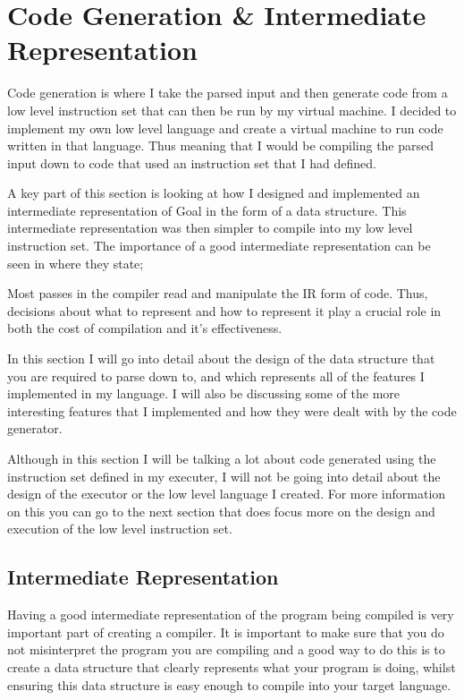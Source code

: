 
\chapter{Code Generation \& Intermediate Representation}

Code generation is where I take the parsed input and then generate code from a low level instruction set that can then be run by my virtual machine. I decided to implement my own low level language and create a virtual machine to run code written in that language. Thus meaning that I would be compiling the parsed input down to code that used an instruction set that I had defined.

A key part of this section is looking at how I designed and implemented an intermediate representation of Goal in the form of a data structure. This intermediate representation was then simpler to compile into my low level instruction set. The importance of a good intermediate representation can be seen in \cite[p.~221]{EngComp2012} where they state;

\begin{displayquote}
Most passes in the compiler read and manipulate the IR form of code. Thus, decisions about what to represent and how to represent it play a  crucial role in both the cost of compilation and it's effectiveness. 
\end{displayquote}

In this section I will go into detail about the design of the data structure that you are required to parse down to, and which represents all of the features I implemented in my language. I will also be discussing some of the more interesting features that I implemented and how they were dealt with by the code generator.

Although in this section I will be talking a lot about code generated using the instruction set defined in my executer, I will not be going into detail about the design of the executor or the low level language I created. For more information on this you can go to the next section that does focus more on the design and execution of the low level instruction set.


\section{Intermediate Representation}

Having a good intermediate representation of the program being compiled is very important part of creating a compiler. It is important to make sure that you do not misinterpret the program you are compiling and a good way to do this is to create a data structure that clearly represents what your program is doing, whilst ensuring this data structure is easy enough to compile into your target language.

